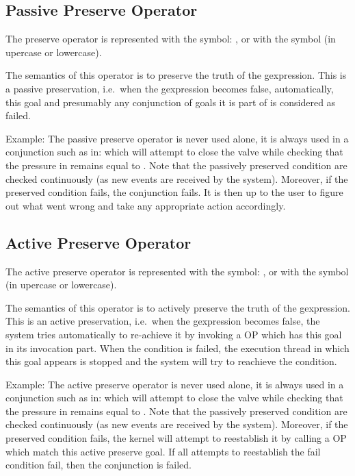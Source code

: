 \subsection{Passive Preserve Operator}

The preserve operator is represented with the symbol: \samp{\#}, or with the
symbol  (in upercase or lowercase).

The semantics of this operator is to preserve the truth of the
gexpression. This is a passive preservation, i.e.\ when the gexpression
becomes false, automatically, this goal and presumably any conjunction of
goals it is part of is considered as failed.

Example: The passive preserve operator is never used alone, it is always used in a
conjunction such as in:  which will attempt to close the valve while checking that the pressure
in  remains equal to . Note that the passively preserved
condition are checked continuously (as new events are received by the system).
Moreover, if the preserved condition fails, the conjunction fails. It is then
up to the user to figure out what went wrong and take any appropriate action
accordingly.

\subsection{Active Preserve Operator}

The active preserve operator is represented with the symbol: \samp{\%}, or with the
symbol  (in upercase or lowercase).

The semantics of this operator is to actively preserve the truth of the
gexpression. This is an active preservation, i.e.\ when the gexpression
becomes false, the system tries automatically to re-achieve it by
invoking a OP which has this goal in its invocation part. When the condition is
failed, the execution thread in which this goal appears is stopped and the
system will try to reachieve the condition.

Example: The active preserve operator is never used alone, it is always used in a
conjunction such as in:  which will attempt to close the valve while checking that the pressure
in  remains equal to . Note that the passively preserved
condition are checked continuously (as new events are received by the system).
Moreover, if the preserved condition fails, the kernel will attempt to
reestablish it by calling a OP which match this active preserve goal. If all
attempts to reestablish the fail condition fail, then the conjunction is failed.


